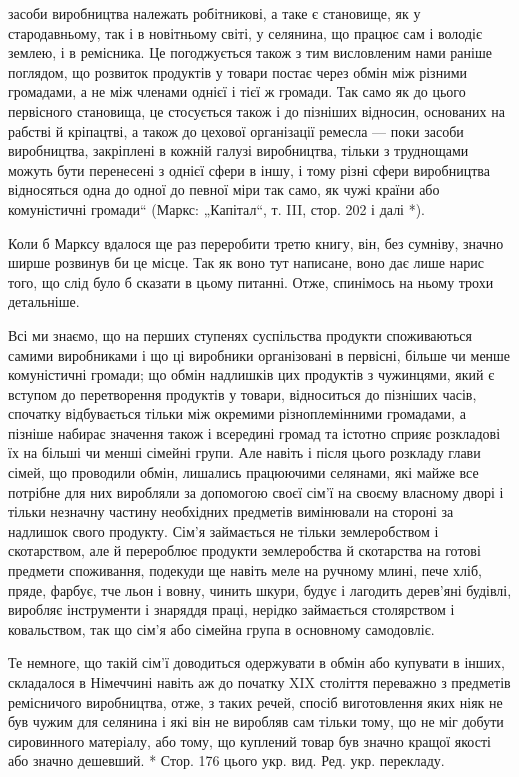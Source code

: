 \parcont{}  %
засоби виробництва належать робітникові, а таке є становище, як у стародавньому, так і в новітньому світі, у селянина, що працює
сам і володіє землею, і в ремісника. Це погоджується також з тим висловленим нами раніше поглядом, що розвиток
продуктів у товари постає через обмін між різними громадами, а не між членами однієї і тієї ж громади. Так само як до цього
первісного становища, це стосується також і до пізніших відносин, основаних на рабстві й кріпацтві, а також до цехової
організації ремесла — поки засоби виробництва, закріплені в кожній галузі виробництва, тільки з труднощами можуть бути
перенесені з однієї сфери в іншу, і тому різні сфери виробництва відносяться одна до одної до певної міри так само, як чужі
країни або комуністичні громади“ (Маркс: „Капітал“,  т. III, стор. 202 і далі *).

Коли б Марксу вдалося ще раз переробити третю книгу, він, без сумніву, значно ширше розвинув би це місце. Так як воно тут
написане, воно дає лише нарис того, що слід було б сказати в цьому питанні. Отже, спинімось на ньому трохи детальніше.

Всі ми знаємо, що на перших ступенях суспільства продукти споживаються самими виробниками і що ці виробники організовані в
первісні, більше чи менше комуністичні громади; що обмін надлишків цих продуктів з чужинцями, який є вступом до перетворення
продуктів у товари, відноситься до пізніших часів, спочатку відбувається тільки між окремими різноплемінними громадами, а
пізніше набирає значення також і всередині громад та істотно сприяє розкладові їх на більші чи менші сімейні групи. Але
навіть і після цього розкладу глави сімей, що проводили обмін, лишались працюючими селянами, які майже все потрібне для
них виробляли за допомогою своєї сім’ї на своєму власному дворі і тільки незначну частину необхідних предметів вимінювали на
стороні за надлишок свого продукту. Сім’я займається не тільки землеробством і скотарством, але й перероблює продукти
землеробства й скотарства на готові предмети споживання, подекуди ще навіть меле на ручному млині, пече хліб, пряде, фарбує,
тче льон і вовну, чинить шкури, будує і лагодить дерев’яні будівлі, виробляє інструменти і знаряддя праці, нерідко
займається столярством і ковальством, так що сім’я або сімейна група в основному самодовліє.

Те немноге, що такій сім’ї
доводиться одержувати в обмін або купувати в інших, складалося в Німеччині навіть аж до початку XIX століття переважно з
предметів ремісничого виробництва, отже, з таких речей, спосіб виготовлення яких ніяк не був чужим для селянина і які він не
виробляв сам тільки тому, що не міг добути сировинного матеріалу, або тому, що куплений товар був значно кращої якості або
значно дешевший.
* Стор. 176 цього укр. вид. Ред. укр. перекладу.
